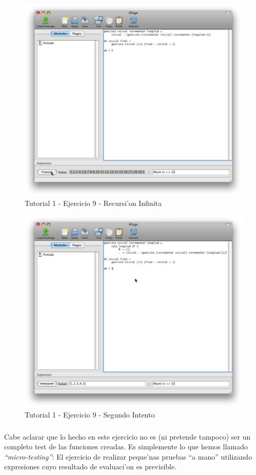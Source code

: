 \documentclass[a4paper]{article}
\begin{document}
\begin{figure}[hp]
	\begin{center}
        	\includegraphics[width=.75\textwidth]{pictures/tut1/07}
		\caption{Tutorial 1 - Ejercicio 9 - Recursi'on Infinita}
		\label{tut107}
	\end{center}
\end{figure}
\begin{figure}[hp]
	\begin{center}
        	\includegraphics[width=.75\textwidth]{pictures/tut1/08}
		\caption{Tutorial 1 - Ejercicio 9 - Segundo Intento}
		\label{tut108}
	\end{center}
\end{figure}
\subparagraph{}Cabe aclarar que lo hecho en este ejercicio no es (ni pretende tampoco) ser un completo test de las funciones creadas.  Es simplemente lo que hemos llamado \textsl{``micro-testing''}: El ejercicio de realizar peque'nas pruebas ``a mano'' utilizando expresiones cuyo resultado de evaluaci'on es previsible.
\end{document}
